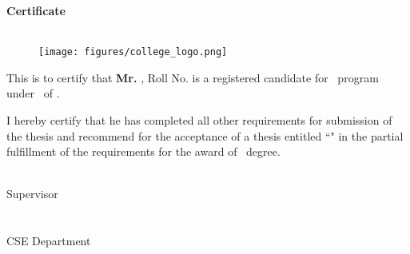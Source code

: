 \begin{center}
    \huge\textbf{Certificate}\\
    \MakeUppercase{\Large{\collegefullname}}\\
    \Large{\department}
\end{center}
\vspace{0.5cm}
\begin{figure}[H]
    \centering
    \texttt{[image: figures/college\_logo.png]}
\end{figure}
\vspace{0.5cm}

This is to certify that \textbf{Mr. \cMembTwo}, Roll No. \textbf{\cMembTwoRoll} is a registered candidate for \courseShort\ program under \department\ of \collegefullname.

I hereby certify that he has completed all other requirements for submission of the thesis and recommend for the acceptance of a thesis entitled ``\textbf{\projectname}" in the partial fulfillment of the requirements for the award of \courseShort\ degree. 


\vspace{2cm}

\begin{minipage}[t]{0.45\textwidth}
    \begin{flushleft}
        {\underline{\hspace{5cm}}}\\
        Supervisor\\
        \guidename\\
        \guideDesignation \\
        CSE Department\\
        \collegefullname\\
        
    \end{flushleft}
\end{minipage}

